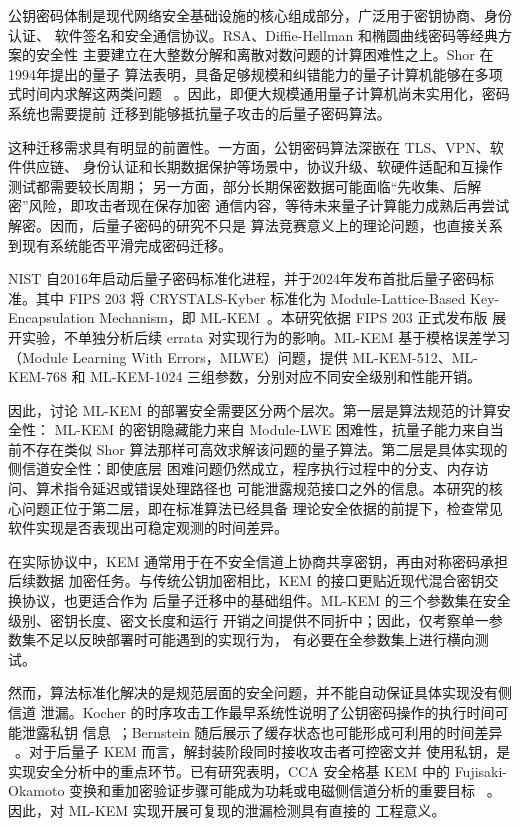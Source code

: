 \documentclass[a4paper,fontset=none]{ctexart}
\begin{document}
公钥密码体制是现代网络安全基础设施的核心组成部分，广泛用于密钥协商、身份认证、
软件签名和安全通信协议。RSA、Diffie-Hellman 和椭圆曲线密码等经典方案的安全性
主要建立在大整数分解和离散对数问题的计算困难性之上。Shor 在1994年提出的量子
算法表明，具备足够规模和纠错能力的量子计算机能够在多项式时间内求解这两类问题
~\cite{Shor1994}。因此，即便大规模通用量子计算机尚未实用化，密码系统也需要提前
迁移到能够抵抗量子攻击的后量子密码算法。

这种迁移需求具有明显的前置性。一方面，公钥密码算法深嵌在 TLS、VPN、软件供应链、
身份认证和长期数据保护等场景中，协议升级、软硬件适配和互操作测试都需要较长周期；
另一方面，部分长期保密数据可能面临``先收集、后解密''风险，即攻击者现在保存加密
通信内容，等待未来量子计算能力成熟后再尝试解密。因而，后量子密码的研究不只是
算法竞赛意义上的理论问题，也直接关系到现有系统能否平滑完成密码迁移。

NIST 自2016年启动后量子密码标准化进程，并于2024年发布首批后量子密码标准。其中
FIPS 203 将 CRYSTALS-Kyber 标准化为 Module-Lattice-Based Key-Encapsulation
Mechanism，即 ML-KEM~\cite{FIPS203,Kyber2021}。本研究依据 FIPS 203 正式发布版
展开实验，不单独分析后续 errata 对实现行为的影响。ML-KEM 基于模格误差学习
（Module Learning With Errors，MLWE）问题，提供 ML-KEM-512、ML-KEM-768 和
ML-KEM-1024 三组参数，分别对应不同安全级别和性能开销。

因此，讨论 ML-KEM 的部署安全需要区分两个层次。第一层是算法规范的计算安全性：
ML-KEM 的密钥隐藏能力来自 Module-LWE 困难性，抗量子能力来自当前不存在类似 Shor
算法那样可高效求解该问题的量子算法。第二层是具体实现的侧信道安全性：即使底层
困难问题仍然成立，程序执行过程中的分支、内存访问、算术指令延迟或错误处理路径也
可能泄露规范接口之外的信息。本研究的核心问题正位于第二层，即在标准算法已经具备
理论安全依据的前提下，检查常见软件实现是否表现出可稳定观测的时间差异。

在实际协议中，KEM 通常用于在不安全信道上协商共享密钥，再由对称密码承担后续数据
加密任务。与传统公钥加密相比，KEM 的接口更贴近现代混合密钥交换协议，也更适合作为
后量子迁移中的基础组件。ML-KEM 的三个参数集在安全级别、密钥长度、密文长度和运行
开销之间提供不同折中；因此，仅考察单一参数集不足以反映部署时可能遇到的实现行为，
有必要在全参数集上进行横向测试。

然而，算法标准化解决的是规范层面的安全问题，并不能自动保证具体实现没有侧信道
泄漏。Kocher 的时序攻击工作最早系统性说明了公钥密码操作的执行时间可能泄露私钥
信息~\cite{Kocher1996}；Bernstein 随后展示了缓存状态也可能形成可利用的时间差异
~\cite{Bernstein2005}。对于后量子 KEM 而言，解封装阶段同时接收攻击者可控密文并
使用私钥，是实现安全分析中的重点环节。已有研究表明，CCA 安全格基 KEM 中的
Fujisaki-Okamoto 变换和重加密验证步骤可能成为功耗或电磁侧信道分析的重要目标
~\cite{Ravi2020,Ueno2022}。因此，对 ML-KEM 实现开展可复现的泄漏检测具有直接的
工程意义。
\end{document}
